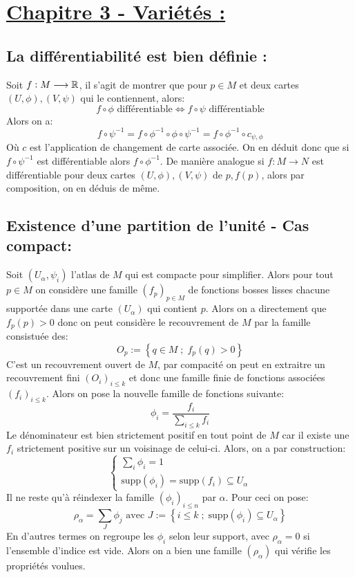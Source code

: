 \section*{\uline{Chapitre 3 - Variétés {:}}}
   \subsection*{La différentiabilité est bien définie {:}}
   Soit \( f : M \longrightarrow \mathbb{R} \), il s'agit de montrer que pour \( p \in M \) et deux cartes \( (U, \phi), (V, \psi) \) qui le contiennent, alors:
   \[ 
      f \circ \phi \text{ différentiable} \iff  f \circ \psi \text{ différentiable}
   \]
   Alors on a: 
   \[ 
      f \circ \psi^{-1} = f \circ \phi^{-1} \circ \phi \circ \psi^{-1} = f \circ \phi^{-1} \circ c_{\psi, \phi}
   \]
   Où \( c \) est l'application de changement de carte associée. On en déduit donc que si \( f \circ \psi^{-1} \) est différentiable alors \(f \circ \phi^{-1}\). De manière analogue si \( f : M \longrightarrow N \) est différentiable pour deux cartes \( (U, \phi), (V, \psi) \) de \( p, f(p) \), alors par composition, on en déduis de même.
   \subsection*{Existence d'une partition de l'unité - Cas compact{:}}
   Soit \( (U_\alpha, \psi_i) \) l'atlas de \( M \) qui est compacte pour simplifier. Alors pour tout \( p \in M \) on considère une famille \( (f_p)_{p \in M} \) de fonctions bosses lisses chacune supportée dans une carte \( (U_\alpha) \) qui contient \( p \). Alors on a directement que \( f_p(p) > 0 \) donc on peut considère le recouvrement de \( M \) par la famille consistuée des:
   \[ 
      O_p := \left\{ q \in M \; ; \; f_p(q) > 0 \right\} 
   \]
   C'est un recouvrement ouvert de \( M \), par compacité on peut en extraitre un recouvrement fini \( (O_i)_{i \leq k} \) et donc une famille finie de fonctions associées \( (f_i)_{i \leq k} \). Alors on pose la nouvelle famille de fonctions suivante:
   \[ 
      \phi_i = \frac{f_i}{\sum_{i \leq k} f_i }
   \]
   Le dénominateur est bien strictement positif en tout point de \( M \) car il existe une \( f_i \) strictement positive sur un voisinage de celui-ci. Alors, on a par construction:
   \[ 
      \begin{cases}
         \sum_i \phi_i = 1\\
         \text{supp}(\phi_i) = \text{supp}(f_i) \subseteq U_\alpha 
      \end{cases} 
   \]
   Il ne reste qu'à réindexer la famille \( (\phi_i)_{i \leq n} \) par \( \alpha \). Pour ceci on pose:
   \[ 
      \rho_\alpha = \sum_J \phi_j \text{ avec } J := \left\{ i \leq k \; ; \; \text{supp}( \phi_i) \subseteq U_\alpha \right\} 
   \] 
   En d'autres termes on regroupe les \( \phi_i \) selon leur support, avec \( \rho_\alpha = 0\) si l'ensemble d'indice est vide. Alors on a bien une famille \( (\rho_\alpha) \) qui vérifie les propriétés voulues.
\pagebreak
